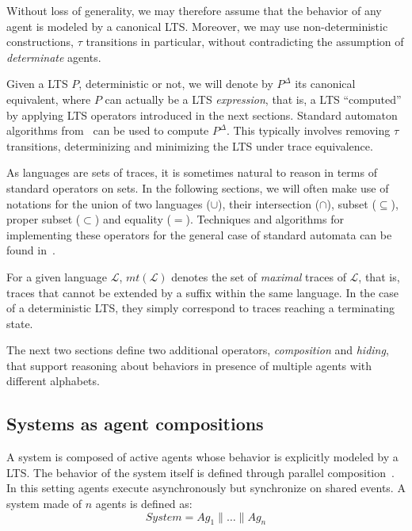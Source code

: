 Without loss of generality, we may therefore assume that the behavior of any agent is modeled by a canonical LTS. Moreover, we may use non-deterministic constructions, $\tau$ transitions in particular, without contradicting the assumption of \emph{determinate} agents. 

Given a LTS $P$, deterministic or not, we will denote by $P^{\Delta}$ its canonical equivalent, where $P$ can actually be a LTS \emph{expression}, that is, a LTS ``computed'' by applying LTS operators introduced in the next sections. Standard automaton algorithms from~\cite{Hopcroft:1979} can be used to compute $P^\Delta$. This typically involves removing $\tau$ transitions, determinizing and minimizing the LTS under trace equivalence.

As languages are sets of traces, it is sometimes natural to reason in terms of standard operators on sets. In the following sections, we will often make use of notations for the union of two languages ($\cup$), their intersection ($\cap$), subset ($\subseteq$), proper subset ($\subset$) and equality ($=$). Techniques and algorithms for implementing these operators for the general case of standard automata can be found in~\cite{Hopcroft:1979, Aho:1986}. 

For a given language $\mathcal{L}$, $mt(\mathcal{L})$ denotes the set of \emph{maximal} traces of $\mathcal{L}$, that is, traces that cannot be extended by a suffix within the same language. In the case of a deterministic LTS, they simply correspond to traces reaching a terminating state.

The next two sections define two additional operators, \emph{composition} and \emph{hiding}, that support reasoning about behaviors in presence of multiple agents with different alphabets.

\subsection{Systems as agent compositions\label{subsection:lts-composition}}

A system is composed of active agents whose behavior is explicitly modeled by a LTS. The behavior of the system itself is defined through parallel composition~\cite{Hoare:1985}. In this setting agents execute asynchronously but synchronize on shared events. A system made of $n$ agents is defined as:
\begin{equation}
System = Ag_1 \parallel \ldots \parallel Ag_n
\label{equation:parallel-composition}
\end{equation}

